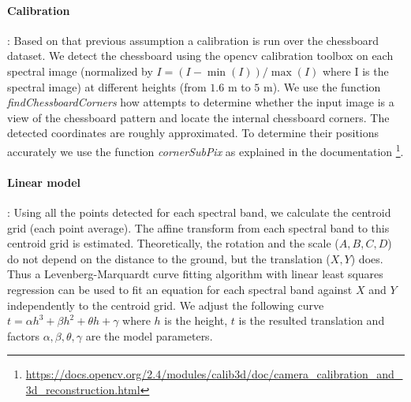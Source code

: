 \documentclass[../thesis.tex]{subfiles}
\begin{document}
	\paragraph{Calibration} :
	Based on that previous assumption a calibration is run over the chessboard dataset.
	We detect the chessboard using the opencv calibration toolbox \cite{Bouguet2001CameraCT}
	on each spectral image (normalized by $I = (I-\min(I))/\max(I)$ where I is the spectral image) at different heights (from $1.6$ m to $5$ m).
	We use the function \textit{findChessboardCorners} how attempts to determine whether the input image is a view of the chessboard pattern and locate the internal chessboard corners.
	The detected coordinates are roughly approximated. To determine their positions accurately we use the function \textit{cornerSubPix} as explained in the documentation \footnote{\url{https://docs.opencv.org/2.4/modules/calib3d/doc/camera_calibration_and_3d_reconstruction.html}}.
	
	\paragraph{Linear model} :
	Using all the points detected for each spectral band, we calculate the centroid grid (each point average).
	The affine transform from each spectral band to this centroid grid is estimated.
	Theoretically, the rotation and the scale ($A,B,C,D$) do not depend on the distance to the ground, but the translation ($X,Y$) does.
	Thus a Levenberg-Marquardt curve fitting algorithm with linear least squares regression \cite{More78}
	can be used to fit an equation for each spectral band against $X$ and $Y$ independently to the centroid grid.
	We adjust the following curve $t = \alpha h^3 + \beta h^2 + \theta h + \gamma$ where $h$ is the height,
	$t$ is the resulted translation and factors $\alpha,\beta,\theta,\gamma$ are the model parameters.
	
\end{document}
